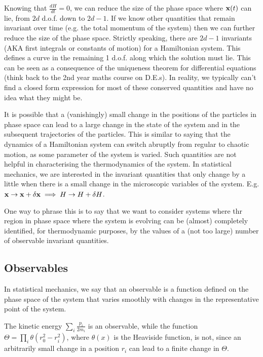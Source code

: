 \documentclass{article}
\begin{document}
Knowing that $\frac{dH}{dt}=0$, we can reduce the size of the phase space where ${\bf x}(t)$ can lie, from $2d$ d.o.f. down to $2d-1$. If we know other quantities that remain invariant over time (e.g. the total momentum of the system) then we can further reduce the size of the phase space. Strictly speaking, there are $2d-1$ invariants (AKA first integrals or constants of motion) for a Hamiltonian system. This defines a curve in the remaining 1 d.o.f. along which the solution must lie. This can be seen as a consequence of the uniqueness theorem for differential equations (think back to the 2nd year maths course on D.E.s). In reality, we typically can't find a closed form expression for most of these conserved quantities and have no idea what they might be.

It is possible that a (vanishingly) small change in the positions of the particles in phase space can lead to a large change in the state of the system and in the subsequent trajectories of the particles.
This is similar to saying that the dynamics of a Hamiltonian system can switch abruptly from regular to chaotic motion, as some parameter of the system is varied. 
Such quantities are not helpful in characterising the thermodynamics of the system.
In statistical mechanics, we are interested in the invariant quantities that only change by a little when there is a small change in the microscopic variables of the system. 
E.g. ${\bf x}\rightarrow {\bf x}+\delta {\bf x} \implies H\rightarrow H+\delta H$.

One way to phrase this is to say that we want to consider systems where thr region in phase space where the system is evolving can be (almost) completely identified, for thermodynamic purposes, by the values of a (not too large) number of observable invariant quantities.

\subsection*{Observables}
In statistical mechanics, we say that an observable is a function defined on the phase space of the system that varies smoothly with changes in the representative point of the system.

The kinetic energy $\sum_i \frac{p_i}{2m_i}$ is an observable, while the function $\Theta = \prod_i \theta(r_0^2-r_i^2)$, where $\theta(x)$ is the Heaviside function, is not, since an arbitrarily small change in a position $r_i$ can lead to a finite change in $\Theta.$
\end{document}
